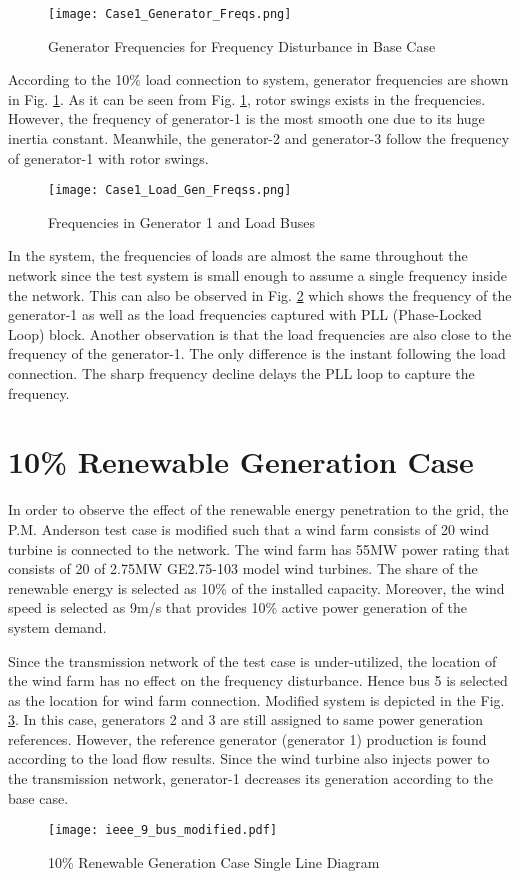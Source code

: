 \begin{figure}[h]
	\centering
	\texttt{[image: Case1\_Generator\_Freqs.png]}
	\caption{Generator Frequencies for Frequency Disturbance in Base Case}
	\label{genfreqcase1}
\end{figure}
According to the 10\% load connection to system, generator frequencies are shown in Fig. \ref{genfreqcase1}. As it can be seen from Fig. \ref{genfreqcase1}, rotor swings exists in the frequencies. However, the frequency of generator-1 is the most smooth one due to its huge inertia constant. Meanwhile, the generator-2 and generator-3 follow the frequency of generator-1 with rotor swings.\par
\begin{figure}[h!]
	\centering
	\texttt{[image: Case1\_Load\_Gen\_Freqss.png]}
	\caption{Frequencies in Generator 1 and Load Buses}
	\label{genfreqcase1_loadgen}
\end{figure}
In the system, the frequencies of loads are almost the same throughout the network since the test system is small enough to assume a single frequency inside the network. This can also be observed in Fig. \ref{genfreqcase1_loadgen} which shows the frequency of the generator-1 as well as the load frequencies captured with PLL (Phase-Locked Loop) block. Another observation is that the load frequencies are also close to the frequency of the generator-1. The only difference is the instant following the load connection. The sharp frequency decline delays the PLL loop to capture the frequency.
\section{10\% Renewable Generation Case}
\label{sec:kmodified}
In order to observe the effect of the renewable energy penetration to the grid, the P.M. Anderson test case is modified such that a wind farm consists of 20 wind turbine is connected to the network. The wind farm has 55MW power rating that consists of 20 of 2.75MW GE2.75-103 model wind turbines. The share of the renewable energy is selected as 10\% of the installed capacity. Moreover, the wind speed is selected as 9m/s that provides 10\% active power generation of the system demand. \par 
Since the transmission network of the test case is under-utilized, the location of the wind farm has no effect on the frequency disturbance. Hence bus 5 is selected as the location for wind farm connection. Modified system is depicted in the Fig. \ref{ieee_9_bus_case2}. In this case, generators 2 and 3 are still assigned to same power generation references. However, the reference generator (generator 1) production is found according to the load flow results. Since the wind turbine also injects power to the transmission network, generator-1 decreases its generation according to the base case.
\begin{figure}[h!]
	\centering
	\texttt{[image: ieee\_9\_bus\_modified.pdf]}
	\caption{10\% Renewable Generation Case Single Line Diagram}
	\label{ieee_9_bus_case2}
\end{figure}
